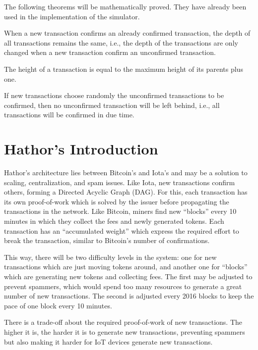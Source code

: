 The following theorems will be mathematically proved. They have already been used in the implementation of the simulator.

\begin{theorem}
\label{theorem-new-tx-not-tip}
When a new transaction confirms an already confirmed transaction, the depth of all transactions remains the same, i.e., the depth of the transactions are only changed when a new transaction confirm an unconfirmed transaction.
\end{theorem}

\begin{theorem}
The height of a transaction is equal to the maximum height of its parents plus one.
\end{theorem}

\begin{theorem}
If new transactions choose randomly the unconfirmed transactions to be confirmed, then no unconfirmed transaction will be left behind, i.e., all transactions will be confirmed in due time.
\end{theorem}

\section{Hathor's Introduction}

Hathor's architecture lies between Bitcoin's and Iota's and may be a solution to scaling, centralization, and spam issues. Like Iota, new transactions confirm others, forming a Directed Acyclic Graph (DAG). For this, each transaction has its own proof-of-work which is solved by the issuer before propagating the transactions in the network. Like Bitcoin, miners find new ``blocks'' every 10 minutes in which they collect the fees and newly generated tokens. Each transaction has an ``accumulated weight'' which express the required effort to break the transaction, similar to Bitcoin's number of confirmations.

This way, there will be two difficulty levels in the system: one for new transactions which are just moving tokens around, and another one for ``blocks'' which are generating new tokens and collecting fees. The first may be adjusted to prevent spammers, which would spend too many resources to generate a great number of new transactions. The second is adjusted every 2016 blocks to keep the pace of one block every 10 minutes.

There is a trade-off about the required proof-of-work of new transactions. The higher it is, the harder it is to generate new transactions, preventing spammers but also making it harder for IoT devices generate new transactions.


